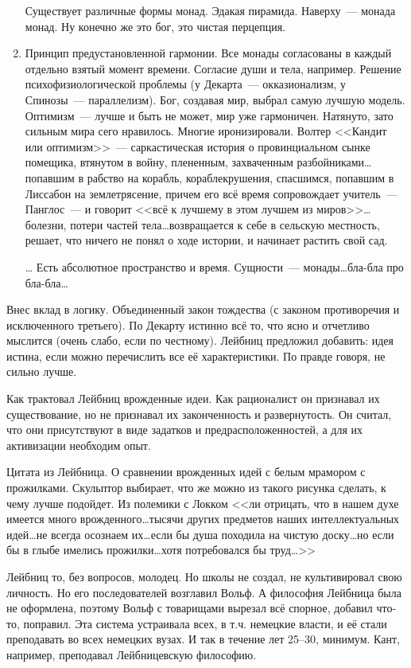 \begin{enumerate}
	Существует различные формы монад. Эдакая пирамида. Наверху~--- монада монад. Ну конечно же это бог, это чистая перцепция.
	\item Принцип предустановленной гармонии. Все монады согласованы в каждый отдельно взятый момент времени. Согласие души и тела, например. Решение психофизиологической проблемы (у Декарта~--- окказионализм, у Спинозы~--- параллелизм). Бог, создавая мир, выбрал самую лучшую модель. Оптимизм~--- лучше и быть не может, мир уже гармоничен. Натянуто, зато сильным мира сего нравилось. Многие иронизировали. Волтер <<Кандит или оптимизм>>~--- саркастическая история о провинциальном сынке помещика, втянутом в войну, плененным, захваченным разбойниками\ldots попавшим в рабство на корабль, кораблекрушения, спасшимся, попавшим в Лиссабон на землетрясение, причем его всё время сопровождает учитель~--- Панглос~--- и говорит <<всё к лучшему в этом лучшем из миров>>\ldots болезни, потери частей тела\ldots возвращается к себе в сельскую местность, решает, что ничего не понял о ходе истории, и начинает растить свой сад. 
	\item[\ldots] Есть абсолютное пространство и время. Сущности~--- монады\ldots бла-бла про бла-бла\ldots 
\end{enumerate}

Внес вклад в логику. Объединенный закон тождества (с законом противоречия и исключенного третьего). По Декарту истинно всё то, что ясно и отчетливо мыслится (очень слабо, если по честному). Лейбниц предложил добавить: идея истина, если можно перечислить все её характеристики. По правде говоря, не сильно лучше.

Как трактовал Лейбниц врожденные идеи. Как рационалист он признавал их существование, но не признавал их законченность и развернутость. Он считал, что они присутствуют в виде задатков и предрасположенностей, а для их активизации необходим опыт.

Цитата из Лейбница. О сравнении врожденных идей с белым мрамором с прожилками. Скульптор выбирает, что же можно из такого рисунка сделать, к чему лучше подойдет. Из полемики с Локком
<< ли отрицать, что в нашем духе имеется много врожденного\ldots тысячи других предметов наших интеллектуальных идей\ldots не всегда осознаем их\ldots если бы душа походила на чистую доску\ldots но если бы в глыбе имелись прожилки\ldots хотя потребовался бы труд\ldots>>

Лейбниц то, без вопросов, молодец. Но школы не создал, не культивировал свою личность. Но его последователей возглавил Вольф. А философия Лейбница была не оформлена, поэтому Вольф с товарищами вырезал всё спорное, добавил что-то, поправил. Эта система устраивала всех, в т.ч. немецкие власти, и её стали преподавать во всех немецких вузах. И так в течение лет 25--30, минимум. Кант, например, преподавал Лейбницевскую философию.
 